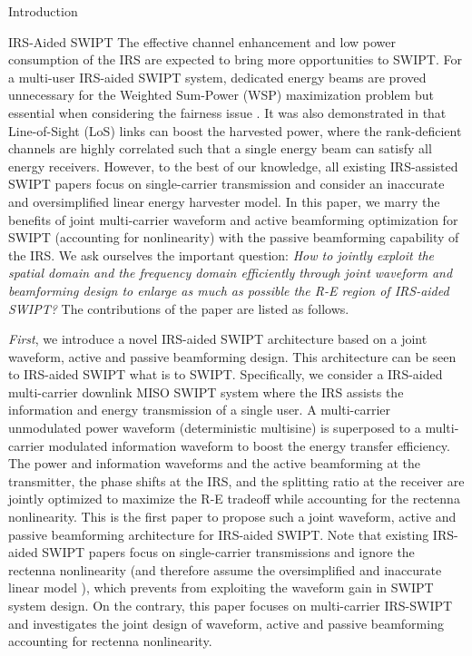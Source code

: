 \documentclass[journal]{IEEEtran}
\begin{document}
\begin{section}{Introduction}
		\begin{subsection}{IRS-Aided SWIPT}
			The effective channel enhancement and low power consumption of the IRS are expected to bring more opportunities to SWIPT. For a multi-user IRS-aided SWIPT system, dedicated energy beams are proved unnecessary for the Weighted Sum-Power (WSP) maximization problem \cite{Wu2020b} but essential when considering the fairness issue \cite{Tang2019}. It was also demonstrated in \cite{Wu2020a} that Line-of-Sight (LoS) links can boost the harvested power, where the rank-deficient channels are highly correlated such that a single energy beam can satisfy all energy receivers. However, to the best of our knowledge, all existing IRS-assisted SWIPT papers focus on single-carrier transmission and consider an inaccurate and oversimplified linear energy harvester model. In this paper, we marry the benefits of joint multi-carrier waveform and active beamforming optimization for SWIPT (accounting for nonlinearity) with the passive beamforming capability of the IRS. We ask ourselves the important question: \textit{How to jointly exploit the spatial domain and the frequency domain efficiently through joint waveform and beamforming design to enlarge as much as possible the R-E region of IRS-aided SWIPT?} The contributions of the paper are listed as follows.

			\textit{First}, we introduce a novel IRS-aided SWIPT architecture based on a joint waveform, active and passive beamforming design. This architecture can be seen to IRS-aided SWIPT what \cite{Clerckx2018b} is to SWIPT. Specifically, we consider a IRS-aided multi-carrier downlink MISO SWIPT system where the IRS assists the information and energy transmission of a single user. A multi-carrier unmodulated power waveform (deterministic multisine) is superposed to a multi-carrier modulated information waveform to boost the energy transfer efficiency. The power and information waveforms and the active beamforming at the transmitter, the phase shifts at the IRS, and the splitting ratio at the receiver are jointly optimized to maximize the R-E tradeoff while accounting for the rectenna nonlinearity. This is the first paper to propose such a joint waveform, active and passive beamforming architecture for IRS-aided SWIPT. Note that existing IRS-aided SWIPT papers \cite{Wu2020b,Tang2019,Wu2020a,Pan2020} focus on single-carrier transmissions and ignore the rectenna nonlinearity (and therefore assume the oversimplified and inaccurate linear model \cite{Clerckx2019,Clerckx2016a}), which prevents from exploiting the waveform gain in SWIPT system design. On the contrary, this paper focuses on multi-carrier IRS-SWIPT and investigates the joint design of waveform, active and passive beamforming accounting for rectenna nonlinearity.


\end{subsection}
\end{section}
\end{document}
